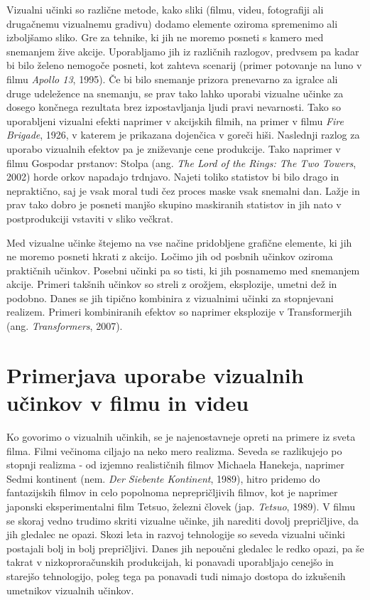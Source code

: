 \documentclass[a4paper, 12pt]{book}
\begin{document}
Vizualni učinki so različne metode, kako sliki (filmu, videu, fotografiji ali drugačnemu vizualnemu gradivu) dodamo elemente oziroma spremenimo ali izboljšamo sliko\cite{vesHandbook}.
Gre za tehnike, ki jih ne moremo posneti s kamero med snemanjem žive  akcije. 
Uporabljamo jih iz različnih razlogov, predvsem pa kadar bi bilo želeno nemogoče posneti, kot zahteva scenarij (primer potovanje na luno v filmu {\it Apollo 13}, 1995).
Če bi bilo snemanje prizora prenevarno za igralce ali druge udeležence na snemanju, se prav tako lahko uporabi vizualne učinke za dosego končnega rezultata brez izpostavljanja ljudi pravi nevarnosti. 
Tako so uporabljeni vizualni efekti naprimer v akcijskih filmih, na primer v filmu {\it Fire Brigade}, 1926, v katerem je prikazana dojenčica v goreči hiši. %
Naslednji razlog za uporabo vizualnih efektov pa je zniževanje cene produkcije. Tako naprimer v filmu Gospodar prstanov: Stolpa (ang. {\it The Lord of the Rings: The Two Towers}, 2002) horde orkov napadajo trdnjavo. Najeti toliko statistov bi bilo drago in nepraktično, saj je vsak moral tudi čez proces maske vsak snemalni dan. Lažje in prav tako dobro je posneti manjšo skupino maskiranih statistov in jih nato v postprodukciji vstaviti v sliko večkrat. 

Med vizualne učinke štejemo na vse načine pridobljene grafične elemente, ki jih ne moremo posneti hkrati z akcijo. 
Ločimo jih od posbnih učinkov oziroma praktičnih učinkov.
Posebni učinki  pa so tisti, ki jih posnamemo med snemanjem akcije.
Primeri takšnih učinkov so streli z orožjem, eksplozije, umetni dež in podobno.
Danes se jih tipično kombinira z vizualnimi učinki za stopnjevani realizem.
Primeri kombiniranih efektov so naprimer eksplozije v Transformerjih (ang. {\it Transformers}, 2007). %

\section{Primerjava uporabe vizualnih učinkov v filmu in videu}

Ko govorimo o vizualnih učinkih, se je najenostavneje opreti na primere iz sveta filma.
Filmi večinoma ciljajo na neko mero realizma.
Seveda se razlikujejo po stopnji realizma - od izjemno realističnih filmov Michaela Hanekeja, naprimer Sedmi kontinent (nem. {\it Der Siebente Kontinent}, 1989), 
hitro pridemo do fantazijskih filmov in celo popolnoma neprepričljivih filmov, kot je naprimer japonski eksperimentalni film Tetsuo, železni človek (jap. {\it Tetsuo}, 1989). 
V filmu se skoraj vedno trudimo skriti vizualne učinke, jih narediti dovolj prepričljive, da jih gledalec ne opazi.
Skozi leta in razvoj tehnologije so seveda vizualni učinki postajali bolj in bolj prepričljivi.
Danes jih nepoučni gledalec le redko opazi, pa še takrat v nizkoproračunskih produkcijah, ki ponavadi uporabljajo cenejšo in starejšo tehnologijo, poleg tega pa ponavadi tudi nimajo dostopa do izkušenih umetnikov vizualnih učinkov.
\end{document}

